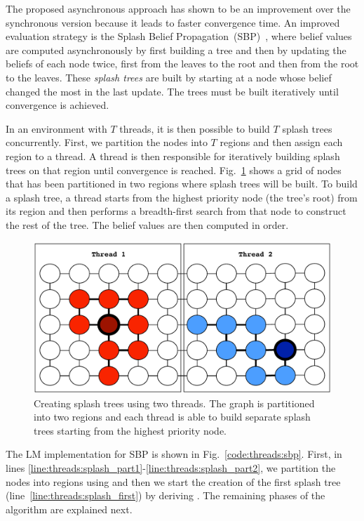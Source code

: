 

The proposed asynchronous approach has shown to be an improvement over the
synchronous version because it leads to faster convergence time. An improved
evaluation strategy is the Splash Belief
Propagation~(SBP)~\cite{Gonzalez+al:aistats09paraml}, where belief values are
computed asynchronously by first building a tree and then by updating the
beliefs of each node twice, first from the leaves to the root and then from the
root to the leaves. These \emph{splash trees} are built by starting at a node
whose belief changed the most in the last update. The trees must be built
iteratively until convergence is achieved.

In an environment with $T$ threads, it is then possible to build $T$ splash
trees concurrently. First, we partition the nodes into $T$ regions and then
assign each region to a thread. A thread is then responsible for iteratively
building splash trees on that region until convergence is reached.
Fig.~\ref{fig:threads:splash_bp} shows a grid of nodes that has been partitioned
in two regions where splash trees will be built. To build a splash tree, a
thread starts from the highest priority node (the tree's root) from its region
and then performs a breadth-first search from that node to construct the rest of
the tree. The belief values are then computed in order.

\begin{figure}[ht]
   \begin{center}
      \includegraphics[width=0.7\linewidth]{figures/threads/splash_bp}
   \end{center}
   \caption{Creating splash trees using two threads. The graph is
      partitioned into two regions and each thread is able to build separate
   splash trees starting from the highest priority node.}
   \label{fig:threads:splash_bp}
\end{figure}

The LM implementation for SBP is shown in Fig.~\ref{code:threads:sbp}. First,
in lines \ref{line:threads:splash_part1}-\ref{line:threads:splash_part2}, we
partition the nodes into regions using  and then we start the
creation of the first splash tree (line~\ref{line:threads:splash_first}) by
deriving .  The remaining phases of the algorithm are
explained next.

